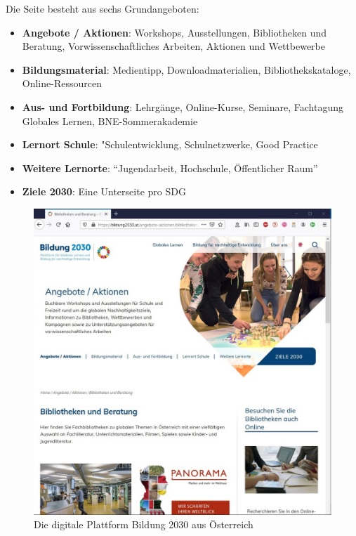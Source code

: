 \documentclass[a4paper,
fontsize=11pt,
oneside,
numbers=noperiodatend,
parskip=half-,
bibliography=totoc,
final
]{scrartcl}
\begin{document}
Die Seite besteht aus sechs Grundangeboten:

\begin{itemize}
\tightlist
\item
  \textbf{Angebote / Aktionen}: Workshops, Ausstellungen, Bibliotheken
  und Beratung, Vorwissenschaftliches Arbeiten, Aktionen und Wettbewerbe
\item
  \textbf{Bildungsmaterial}: Medientipp, Downloadmaterialien,
  Bibliothekskataloge, Online-Res\-sour\-cen
\item
  \textbf{Aus- und Fortbildung}: Lehrgänge, Online-Kurse, Seminare,
  Fachtagung Globales Lernen, BNE-Sommerakademie
\item
  \textbf{Lernort Schule}: "Schulentwicklung, Schulnetzwerke, Good
  Practice
\item
  \textbf{Weitere Lernorte}: \enquote{Jugendarbeit, Hochschule,
  Öffentlicher Raum}
\item
  \textbf{Ziele 2030}: Eine Unterseite pro SDG
\end{itemize}

\begin{figure}
\centering
\includegraphics{img/screenshot_1.jpg}
\caption{Die digitale Plattform Bildung 2030 aus Österreich}
\end{figure}
\end{document}
